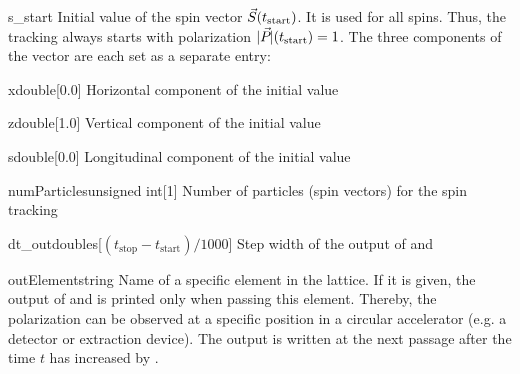 \documentclass[a4paper]{scrartcl}
\begin{document}
\begin{configdocgroup}{s_start}
  Initial value of the spin vector $\vec{S}_{}(t_\text{start})$. It is used for all spins.
  Thus, the tracking always starts with polarization $|\vec{P}_{}|(t_\text{start}) = 1$. The
  three components of the vector are each set as a separate entry:
  
  \begin{configdoc}{x}{double}{}[0.0]
    Horizontal component \sx of the initial value
  \end{configdoc}

  \begin{configdoc}{z}{double}{}[1.0]
    Vertical component \sz of the initial value
  \end{configdoc}

  \begin{configdoc}{s}{double}{}[0.0]
    Longitudinal component \slong of the initial value
  \end{configdoc}
\end{configdocgroup}

\begin{configdoc}{numParticles}{unsigned int}{}[1]
  Number of particles (spin vectors) for the spin tracking
\end{configdoc}

\begin{configdoc}{dt_out}{double}{\si{\s}}[$(t_\text{stop}-t_\text{start})/1000$]
  Step width of the output of \pvec and \svec[i]
\end{configdoc}

\begin{configdoc}{outElement}{string}{}
  Name of a specific element in the lattice. If it is given, the output of \pvec and
  \svec[i] is printed only when passing this element. Thereby, the polarization can be
  observed at a specific position in a circular accelerator (e.g. a detector or extraction
  device). The output is written at the next passage after the time $t$ has increased by
  .
\end{configdoc}
\end{document}
